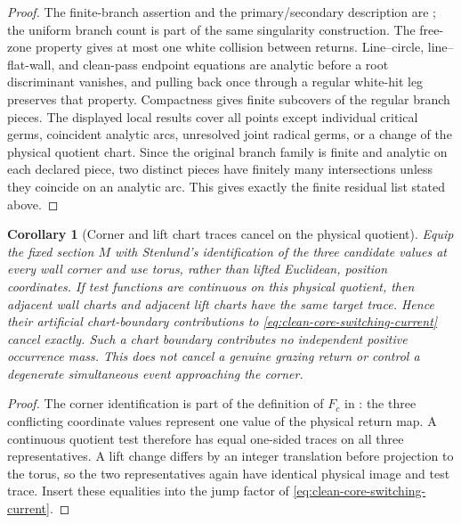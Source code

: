 \documentclass[11pt]{article}
\newtheorem{corollary}[theorem]{Corollary}
\begin{document}
\begin{proof}
The finite-branch assertion and the primary/secondary description are
\cite[Section~4.1]{StenlundRandom}; the uniform branch count is part of the
same singularity construction.  The free-zone property gives at most one
white collision between returns.  Line--circle, line--flat-wall, and
clean-pass endpoint equations are analytic before a root discriminant
vanishes, and pulling back once through a regular white-hit leg preserves
that property.  Compactness gives finite subcovers of the regular branch
pieces.  The displayed local results cover all points except individual
critical germs, coincident analytic arcs, unresolved joint radical germs,
or a change of the physical quotient chart.  Since the original branch
family is finite and analytic on each declared piece, two distinct pieces
have finitely many intersections unless they coincide on an analytic arc.
This gives exactly the finite residual list stated above.
\end{proof}

\begin{corollary}[Corner and lift chart traces cancel on the physical
quotient]
\label{cor:fixed-section-corner-lift-trace}
Equip the fixed section $M$ with Stenlund's identification of the three
candidate values at every wall corner and use torus, rather than lifted
Euclidean, position coordinates.  If test functions are continuous on this
physical quotient, then adjacent wall charts and adjacent lift charts have
the same target trace.  Hence their artificial chart-boundary contributions
to \eqref{eq:clean-core-switching-current} cancel exactly.  Such a chart
boundary contributes no independent positive occurrence mass.  This does
not cancel a genuine grazing return or control a degenerate simultaneous
event approaching the corner.
\end{corollary}

\begin{proof}
The corner identification is part of the definition of $F_c$ in
\cite[Section~2.3]{StenlundRandom}: the three conflicting coordinate values
represent one value of the physical return map.  A continuous quotient test
therefore has equal one-sided traces on all three representatives.  A lift
change differs by an integer translation before projection to the torus, so
the two representatives again have identical physical image and test trace.
Insert these equalities into the jump factor of
\eqref{eq:clean-core-switching-current}.
\end{proof}
\end{document}
